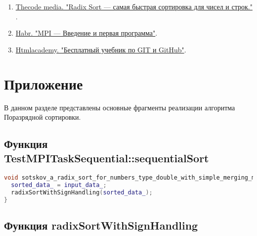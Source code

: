 \documentclass[12pt]{article}
\begin{document}
\begin{enumerate}
    \item \href{https://thecode.media/radix/}{Thecode media. "Radix Sort — самая быстрая сортировка для чисел и строк." }.
    \item \href{https://habr.com/ru/articles/548266/5}{Habr. "MPI — Введение и первая программа"}.
     \item \href{https://htmlacademy.ru/blog/html_old}{Htmlacademy. "Бесплатный учебник по GIT и GitHub"}.
\end{enumerate}


\appendix
\section*{Приложение}

В данном разделе представлены основные фрагменты реализации алгоритма Поразрядной сортировки.
\subsection*{Функция TestMPITaskSequential::sequentialSort}

\begin{lstlisting}[language=C++]
void sotskov_a_radix_sort_for_numbers_type_double_with_simple_merging_mpi::TestMPITaskSequential::sequentialSort() {
  sorted_data_ = input_data_;
  radixSortWithSignHandling(sorted_data_);
}
\end{lstlisting}


\subsection*{Функция radixSortWithSignHandling}
\end{document}
